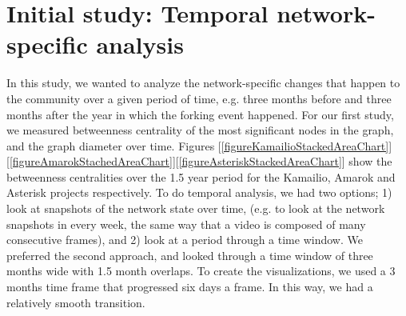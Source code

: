 \documentclass{acm_proc_article-sp}
\begin{document}

%
%

\section{Initial study: Temporal network-specific analysis}

In this study, we wanted to analyze the network-specific changes that happen to the community over a given period of time, e.g. three months before and three months after the year in which the forking event happened. For our first study, we measured betweenness centrality \cite{Brandes} of the most significant nodes in the graph, and the graph diameter over time. Figures [\ref{figureKamailioStackedAreaChart}][\ref{figureAmarokStachedAreaChart}][\ref{figureAsteriskStackedAreaChart}] show the betweenness centralities over the 1.5 year period for the Kamailio, Amarok and Asterisk projects respectively. To do temporal analysis, we had two options; 1) look at snapshots of the network state over time, (e.g. to look at the network snapshots in every week, the same way that a video is composed of many consecutive frames), and 2) look at a period through a time window. We preferred the second approach, and looked through a time window of three months wide with 1.5 month overlaps. To create the visualizations, we used a 3 months time frame that progressed six days a frame. In this way, we had a relatively smooth transition.
\end{document}

